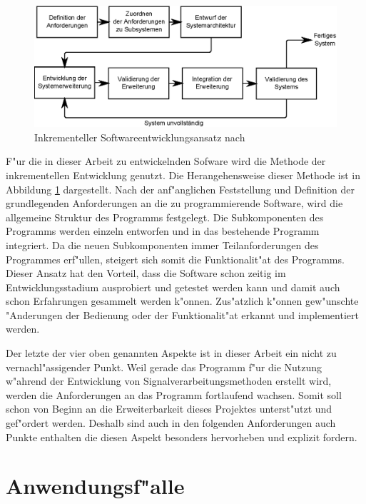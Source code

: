 \begin{figure}
\centering
\includegraphics[width=\textwidth]{bilder/inkrementelle_entwicklung.eps}
\caption{Inkrementeller Softwareentwicklungsansatz nach \cite{Sommerville2001a}}
\label{pic:inkrementelle_entwicklung}
\end{figure}
F"ur die in dieser Arbeit zu entwickelnden Sofware wird die Methode der inkrementellen Entwicklung genutzt.
Die Herangehensweise dieser Methode ist in Abbildung \ref{pic:inkrementelle_entwicklung} dargestellt.
Nach der anf"anglichen Feststellung und Definition der grundlegenden Anforderungen an die zu programmierende Software, wird die allgemeine Struktur des Programms festgelegt.
Die Subkomponenten des Programms werden einzeln entworfen und in das bestehende Programm integriert.
Da die neuen Subkomponenten immer Teilanforderungen des Programmes erf"ullen, steigert sich somit die Funktionalit"at des Programms.
Dieser Ansatz hat den Vorteil, dass die Software schon zeitig im Entwicklungsstadium ausprobiert und getestet werden kann und damit auch schon Erfahrungen gesammelt werden k"onnen.
Zus"atzlich k"onnen gew"unschte "Anderungen der Bedienung oder der Funktionalit"at erkannt und implementiert werden.

Der letzte der vier oben genannten Aspekte ist in dieser Arbeit ein nicht zu vernachl"assigender Punkt.
Weil gerade das Programm f"ur die Nutzung w"ahrend der Entwicklung von Signalverarbeitungsmethoden erstellt wird, werden die Anforderungen an das Programm fortlaufend wachsen.
Somit soll schon von Beginn an die Erweiterbarkeit dieses Projektes unterst"utzt und gef"ordert werden.
Deshalb sind auch in den folgenden Anforderungen auch Punkte enthalten die diesen Aspekt besonders hervorheben und explizit fordern.


\section{Anwendungsf"alle}

